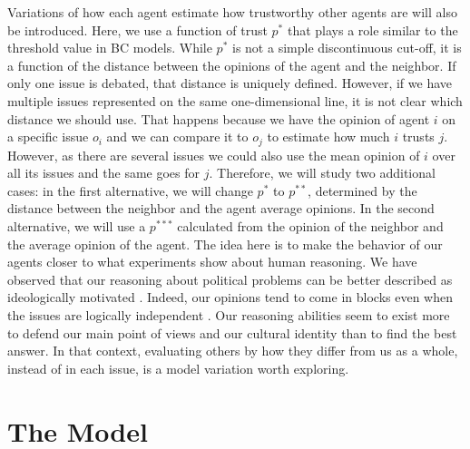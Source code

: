 \documentclass{article}
\begin{document}
Variations of how each agent estimate how trustworthy other agents are will also
be introduced. Here, we use a function of trust $p^*$ that plays a role similar
to the threshold value in BC models. While $p^*$ is not a simple discontinuous
cut-off, it is a function of the distance between the opinions of the agent and
the neighbor. If only one issue is debated, that distance is uniquely defined.
However, if we have multiple issues represented on the same one-dimensional
line, it is not clear which distance we should use. That happens because we have
the opinion of agent $i$ on a specific issue $o_i$ and we can compare it to
$o_j$ to estimate how much $i$ trusts $j$. However, as there are several issues
we could also use the mean opinion of $i$ over all its issues and the same goes
for $j$. Therefore, we will study two additional cases: in the first
alternative, we will change \(p^*\) to \(p^{**}\), determined by the distance
between the neighbor and the agent average opinions. In the second alternative,
we will use a \(p^{***}\) calculated from the opinion of the neighbor and the
average opinion of the agent. The idea here is to make the behavior of our
agents closer to what experiments show about human reasoning. We have observed
that our reasoning about political problems can be better described as
ideologically motivated \cite{jostetal03a,taberlodge06a,Claassen2015a}. Indeed,
our opinions tend to come in blocks even when the issues are logically
independent \cite{jervis76a}. Our reasoning abilities seem to exist more to
defend our main point of views \cite{mercier11a,merciersperber11a} and our
cultural identity \cite{kahanetal11} than to find the best answer. In that
context, evaluating others by how they differ from us as a whole, instead of in
each issue, is a model variation worth exploring.
 
\section{The Model}
\end{document}
